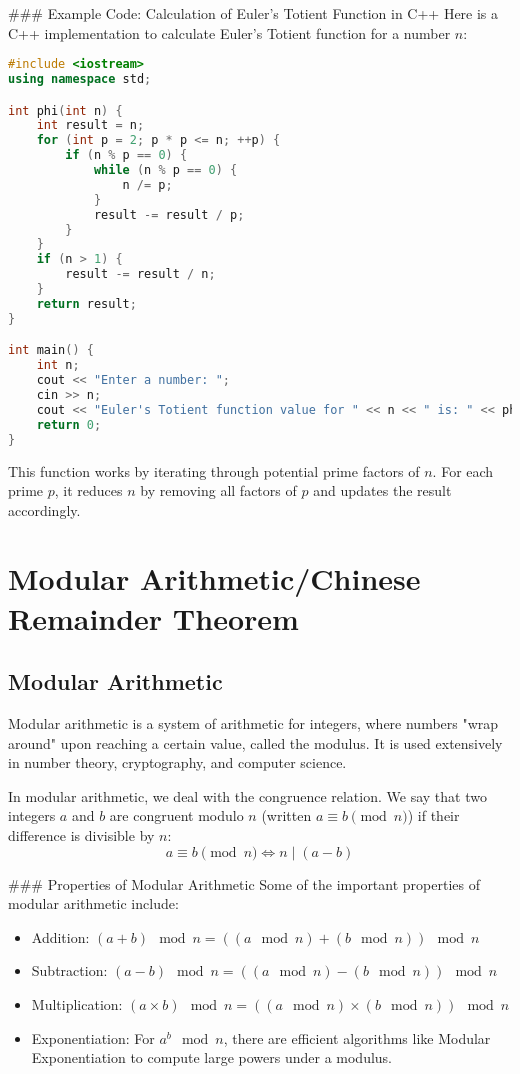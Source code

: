 \documentclass[10pt,a4paper]{article}
\begin{document}
### Example Code: Calculation of Euler’s Totient Function in C++
Here is a C++ implementation to calculate Euler's Totient function for a number \(n\):

\begin{lstlisting}[language=C++]
#include <iostream>
using namespace std;

int phi(int n) {
    int result = n; 
    for (int p = 2; p * p <= n; ++p) {
        if (n % p == 0) {
            while (n % p == 0) {
                n /= p;
            }
            result -= result / p;
        }
    }
    if (n > 1) {
        result -= result / n;
    }
    return result;
}

int main() {
    int n;
    cout << "Enter a number: ";
    cin >> n;
    cout << "Euler's Totient function value for " << n << " is: " << phi(n) << endl;
    return 0;
}
\end{lstlisting}

This function works by iterating through potential prime factors of \(n\). For each prime \(p\), it reduces \(n\) by removing all factors of \(p\) and updates the result accordingly.


\section*{Modular Arithmetic/Chinese Remainder Theorem}

\subsection*{Modular Arithmetic}

Modular arithmetic is a system of arithmetic for integers, where numbers "wrap around" upon reaching a certain value, called the modulus. It is used extensively in number theory, cryptography, and computer science.

In modular arithmetic, we deal with the congruence relation. We say that two integers \(a\) and \(b\) are congruent modulo \(n\) (written \(a \equiv b \pmod{n}\)) if their difference is divisible by \(n\):
\[
a \equiv b \pmod{n} \iff n \mid (a - b)
\]

### Properties of Modular Arithmetic
Some of the important properties of modular arithmetic include:

\begin{itemize}
    \item Addition: \( (a + b) \mod n = ((a \mod n) + (b \mod n)) \mod n \)
    \item Subtraction: \( (a - b) \mod n = ((a \mod n) - (b \mod n)) \mod n \)
    \item Multiplication: \( (a \times b) \mod n = ((a \mod n) \times (b \mod n)) \mod n \)
    \item Exponentiation: For \( a^b \mod n \), there are efficient algorithms like Modular Exponentiation to compute large powers under a modulus.
\end{itemize}
\end{document}

